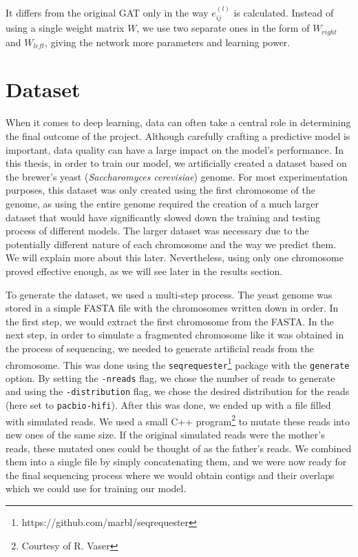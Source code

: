 \documentclass[times, utf8, diplomski, english]{fer_eng}
\begin{document}
It differs from the original GAT only in the way $e_{ij}^{(l)}$ is calculated. Instead of using a single weight matrix $W$, we use two separate ones in the form of $W_{right}$ and $W_{left}$, giving the network more parameters and learning power.

\chapter{Dataset}

When it comes to deep learning, data can often take a central role in determining the final outcome of the project. Although carefully crafting a predictive model is important, data quality can have a large impact on the model's performance. In this thesis, in order to train our model, we artificially created a dataset based on the brewer's yeast (\textit{Saccharomyces cerevisiae}) genome. For most experimentation purposes, this dataset was only created using the first chromosome of the genome, as using the entire genome required the creation of a much larger dataset that would have significantly slowed down the training and testing process of different models. The larger dataset was necessary due to the potentially different nature of each chromosome and the way we predict them. We will explain more about this later. Nevertheless, using only one chromosome proved effective enough, as we will see later in the results section.

To generate the dataset, we used a multi-step process. The yeast genome was stored in a simple FASTA file with the chromosomes written down in order. In the first step, we would extract the first chromosome from the FASTA. In the next step, in order to simulate a fragmented chromosome like it was obtained in the process of sequencing, we needed to generate artificial reads from the chromosome. This was done using the \texttt{seqrequester}\footnote{https://github.com/marbl/seqrequester} package with the \texttt{generate} option. By setting the \texttt{-nreads} flag, we chose the number of reads to generate and using the \texttt{-distribution} flag, we chose the desired distribution for the reads (here set to \texttt{pacbio-hifi}). After this was done, we ended up with a file filled with simulated reads. We used a small C++ program\footnote{Courtesy of R. Vaser} to mutate these reads into new ones of the same size. If the original simulated reads were the mother's reads, these mutated ones could be thought of as the father's reads. We combined them into a single file by simply concatenating them, and we were now ready for the final sequencing process where we would obtain contigs and their overlaps which we could use for training our model.
\end{document}
